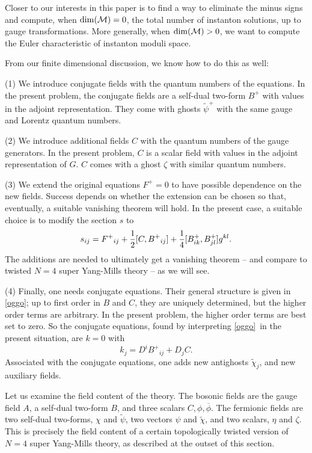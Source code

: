 \documentclass[12pt]{article}
\numberwithin{equation}{section}
\def\tilde{\widetilde}
\def\bar{\overline}
\begin{document}
\bigskip
{}

Closer to our interests in this paper is to find a way to eliminate
the minus signs and compute, when ${\rm dim}({\cal M})=0$, the total
number of instanton solutions, up to gauge transformations.  More
generally, when ${\rm dim}({\cal M})>0$, we want to compute the
Euler characteristic of instanton moduli space.

{}From our finite dimensional discussion, we know how to do this as well:

(1) We introduce conjugate fields with the quantum numbers of the equations.
In the present problem, the conjugate
fields are a self-dual two-form $B^+$ with values in the adjoint
representation.  They come with
ghosts $\tilde \psi^+$ with the same gauge and Lorentz quantum numbers.

(2) We introduce additional fields $C$ with the quantum numbers of the
gauge generators.  In the present problem, $C$ is a scalar field with values
in the adjoint representation of $G$.  $C$ comes with a ghost $\zeta$
with similar quantum numbers.

(3)  We extend the original equations $F^+=0$ to have possible dependence
on the new fields.  Success depends on whether the extension can be chosen
so that, eventually, a suitable vanishing theorem will hold.  In the
present case, a suitable choice is to modify the section $s$ to
\begin{equation}
  \label{news}
  s_{ij}=F^+{}_{ij}+{1\over 2}[C,B^+{}_{ij}]+{1\over 4}
  [B^+_{ik},B^+_{jl}]g^{kl}.
\end{equation}
The additions are needed to ultimately get a vanishing theorem -- and
compare to twisted $N=4$ super Yang-Mills theory --  as we
will see.

(4)  Finally, one needs conjugate equations.  Their general structure
is given in \eqref{oggo}; up to first order in $B$ and $C$, they are uniquely
determined, but the higher order terms are arbitrary.  In the present
problem, the higher order terms are best set to zero.  So the conjugate
equations, found by interpreting \eqref{oggo}\ in the present situation,
are $k=0$ with
\begin{equation}
  k_j=D^iB^+{}_{ij}+D_jC.
\end{equation}
Associated with the conjugate equations, one adds new antighosts
$\tilde\chi_j$, and new auxiliary fields.

Let us examine the field content of the theory.
The bosonic fields are the gauge field $A$, a self-dual two-form $B$,
and three scalars $C,\phi,\bar\phi$.  The fermionic fields are
two self-dual two-forms, $\chi$ and $\tilde\psi$, two vectors $\psi$
and $\tilde \chi$, and two scalars, $\eta$ and $\zeta$.  This is precisely
the field content of a certain topologically twisted version of
$N=4$ super Yang-Mills theory, as described at the outset of this
section.
\end{document}
